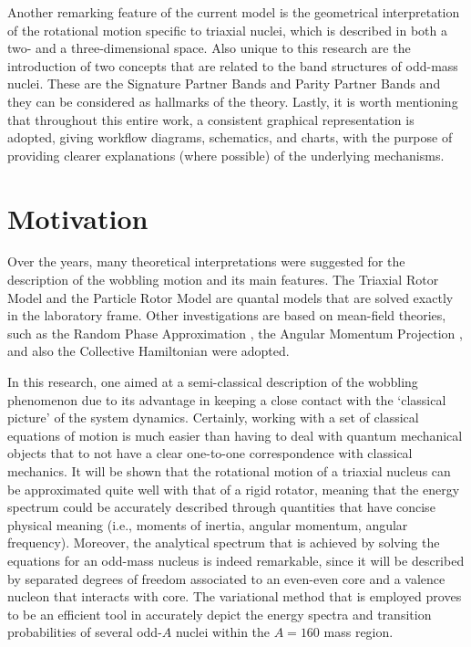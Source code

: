 Another remarking feature of the current model is the geometrical interpretation of the rotational motion specific to triaxial nuclei, which is described in both a two- and a three-dimensional space. Also unique to this research are the introduction of two concepts that are related to the band structures of odd-mass nuclei. These are the Signature Partner Bands and Parity Partner Bands and they can be considered as hallmarks of the theory. Lastly, it is worth mentioning that throughout this entire work, a consistent graphical representation is adopted, giving workflow diagrams, schematics, and charts, with the purpose of providing clearer explanations (where possible) of the underlying mechanisms.

\section{Motivation}

Over the years, many theoretical interpretations were suggested for the description of the wobbling motion and its main features. The Triaxial Rotor Model \cite{bohr1998nuclear,davydov1958rotational} and the Particle Rotor Model \cite{hamamoto2002wobbling} are quantal models that are solved exactly in the laboratory frame. Other investigations are based on mean-field theories, such as the Random Phase Approximation \cite{shimizu1995nuclear}, the Angular Momentum Projection \cite{oi2000wobbling}, and also the Collective Hamiltonian \cite{chen2014collective} were adopted.

In this research, one aimed at a semi-classical description of the wobbling phenomenon due to its advantage in keeping a close contact with the `classical picture' of the system dynamics. Certainly, working with a set of classical equations of motion is much easier than having to deal with quantum mechanical objects that to not have a clear one-to-one correspondence with classical mechanics. It will be shown that the rotational motion of a triaxial nucleus can be approximated quite well with that of a rigid rotator, meaning that the energy spectrum could be accurately described through quantities that have concise physical meaning (i.e., moments  of inertia, angular momentum, angular frequency). Moreover, the analytical spectrum that is achieved by solving the equations for an odd-mass nucleus is indeed remarkable, since it will be described by separated degrees of freedom associated to an even-even core and a valence nucleon that interacts with core. The variational method that is employed proves to be an efficient tool in accurately depict the energy spectra and transition probabilities of several odd-$A$ nuclei within the $A=160$ mass region.


